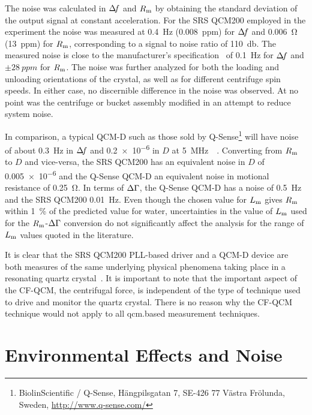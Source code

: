 The noise was calculated in $\Delta\!f$ and $R_\mathrm{m}$ by obtaining the standard
deviation of the output signal at constant acceleration.  For the SRS
QCM200 employed in the experiment the noise was measured at
\SI{0.4}{\hertz} (\SI{0.008}{ppm}) for $\Delta\!f$ and \SI{0.006}{\ohm}
(\SI{13}{ppm}) for $R_\mathrm{m}$, corresponding to a signal to noise ratio of
\SI{110}{\decibel}.  The measured noise is close to the manufacturer's
specification~\cite{srsqcm200manual} of \SI{0.1}{\hertz} for $\Delta\!f$ and
$\pm\SI{28}{ppm}$ for $R_\mathrm{m}$.  The noise was further analyzed for both the
loading and unloading orientations of the crystal, as well as for different
centrifuge spin speeds.  In either case, no discernible difference in the
noise was observed.  At no point was the centrifuge or bucket assembly
modified in an attempt to reduce system noise.

In comparison, a typical QCM-D such as those sold by
Q-Sense\footnote{BiolinScientific / Q-Sense, Hängpilsgatan 7, SE-426 77
Västra Frölunda, Sweden,  \url{http://www.q-sense.com/}} will have noise of
about \SI{0.3}{\hertz} in $\Delta\!f$ and \num{0.2e-6} in $D$ at
\SI{5}{\mega\hertz}~\cite{su2005comparison}~\cite{peh2007understanding}.
Converting from $R_\mathrm{m}$ to $D$ and vice-versa, the SRS QCM200 has an
equivalent noise in $D$ of \num{0.005e-6} and the Q-Sense QCM-D an
equivalent noise in motional resistance of \SI{0.25}{\ohm}.  In terms of
$\Delta\Gamma$, the Q-Sense QCM-D has a noise of \SI{0.5}{\hertz} and the SRS QCM200
\SI{0.01}{\hertz}.  Even though the chosen value for $L_\mathrm{m}$ gives $R_\mathrm{m}$
within \SI{1}{\percent} of the predicted value for water, uncertainties in
the value of $L_\mathrm{m}$ used for the $R_\mathrm{m}$-$\Delta\Gamma$ conversion do not significantly
affect the analysis for the range of $L_\mathrm{m}$ values quoted in the literature.

It is clear that the SRS QCM200 PLL-based driver and a QCM-D device are
both measures of the same underlying physical phenomena taking place in a
resonating quartz crystal~\cite{geelhood2002transient}.  It is important to
note that the important aspect of the CF-QCM, the centrifugal force, is
independent of the type of technique used to drive and monitor the quartz
crystal.  There is no reason why the CF-QCM technique would not apply to
all \gls{qcm}.based measurement techniques.

\section{Environmental Effects and Noise}

